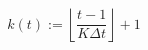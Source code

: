 \begin{equation}
	k(t) := \left\lfloor\frac{t-1}{K\Delta t}\right\rfloor+1
	\label{ch1:equ:synchronisation-function}
\end{equation}